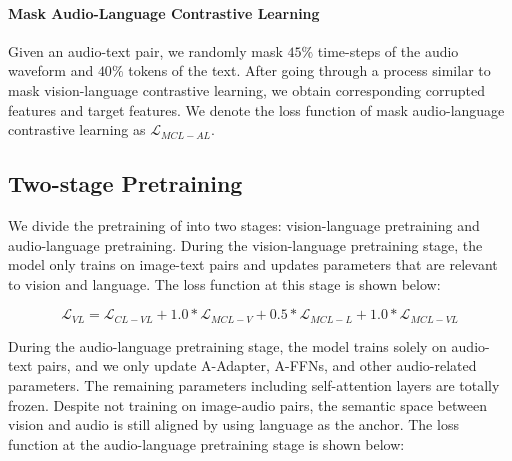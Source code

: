 

\paragraph{Mask Audio-Language Contrastive Learning}
Given an audio-text pair, we randomly mask $45\%$ time-steps of the audio waveform and $40\%$ tokens of the text.
After going through a process similar to mask vision-language contrastive learning, we obtain corresponding corrupted features and target features. 
We denote the loss function of mask audio-language contrastive learning as $\mathcal{L}_{MCL-AL}$.

\subsection{Two-stage Pretraining}
\label{sec:two_stage_pretraining}
We divide the pretraining of \onepeace into two stages: vision-language pretraining and audio-language pretraining.
During the vision-language pretraining stage, the model only trains on image-text pairs and updates parameters that are relevant to vision and language.
The loss function at this stage is shown below:

\begin{equation}
\mathcal{L}_{VL} = \mathcal{L}_{CL-VL} + 1.0*\mathcal{L}_{MCL-V} + 0.5*\mathcal{L}_{MCL-L} + 1.0*\mathcal{L}_{MCL-VL}
\end{equation}

During the audio-language pretraining stage, the model trains solely on audio-text pairs, and we only update A-Adapter, A-FFNs, and other audio-related parameters. 
The remaining parameters including self-attention layers are totally frozen.
Despite not training on image-audio pairs, the semantic space between vision and audio is still aligned by using language as the anchor.
The loss function at the audio-language pretraining stage is shown below:

